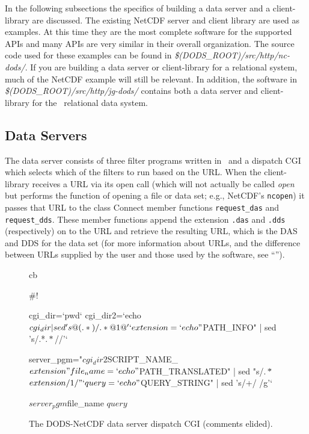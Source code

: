 In the following subsections the specifics of building a data server and a
client-library are discussed. The existing NetCDF server and client library
are used as examples. At this time they are the most complete software for
the supported APIs and many APIs are very similar in their overall
organization. The source code used for these examples can be found in {\em
  \$(DODS\_ROOT)/src/http/nc-dods/\/}. If you are building a data server or
client-library for a relational system, much of the NetCDF example will still
be relevant. In addition, the software in {\em
  \$(DODS\_ROOT)/src/http/jg-dods/\/} contains both a data server and
client-library for the \JGOFS\ relational data system.

\subsection{Data Servers}

The data server consists of three filter programs written in \Cpp\ and a
dispatch CGI which selects which of the filters to run based on the URL. When
the client-library receives a URL via its open call (which will not actually
be called {\em open\/} but performs the function of opening a file or data
set; e.g., NetCDF's {\tt ncopen}) it passes that URL to the class Connect
member functions {\tt request\_das} and {\tt request\_dds}. These member
functions append the extension {\tt .das} and {\tt .dds} (respectively) on to
the URL and retrieve the resulting URL, which is the DAS and DDS for the data
set (for more information about URLs, and the difference between URLs
supplied by the user and those used by the software, see ``\URL'').

\begin{figure}
\begin{code}{cb}

#!\bin\sh

cgi_dir=`pwd`
cgi_dir2=`echo $cgi_dir | sed 's@\\(.*\\)/.*@\\1@'`

extension=`echo "$PATH_INFO" | sed 's/.*\.\(.*\)/\1/'`

server_pgm="${cgi_dir2}${SCRIPT_NAME}_${extension}"

file_name=`echo "$PATH_TRANSLATED" | sed "s/\(.*\)\.${extension}/\\1/"`

query=`echo "$QUERY_STRING" | sed 's/+/ /g'` 

$server_pgm $file_name $query
$

\end{code}
\caption{The DODS-NetCDF data server dispatch CGI (comments elided).}
\label{fig:cgi}
\end{figure}

